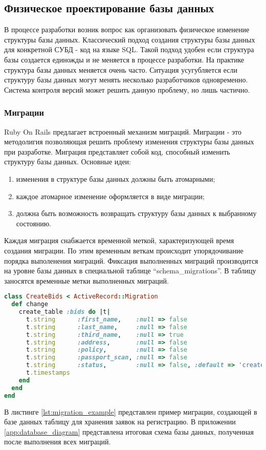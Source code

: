 \subsection{Физическое проектирование базы данных}
В процессе разработки возник вопрос как организовать физическое изменение
структуры базы данных. Классический подход создания структуры базы данных для
конкретной СУБД - код на языке SQL. Такой подход удобен если структура базы
создается единожды и не меняется в процессе разработки. На практике структура
базы данных меняется очень часто. Ситуация усугубляется если структуру базы
данных могут менять несколько разработчиков одновременно. Система контроля
версий может решить данную проблему, но лишь частично.

\subsubsection{Миграции}
Ruby On Rails предлагает встроенный механизм миграций. Миграции - это
методолигия позволяющая решить проблему изменения структуры базы данных при
разработке. Миграция представляет собой код, способный изменить структуру базы
данных.
Основные идеи:
\begin{enumerate}
  \item изменения в структуре базы данных должны быть атомарными;
  \item каждое атомарное изменение оформляется в виде миграции;
  \item должна быть возможность возвращать структуру базы данных к выбранному
состоянию.
\end{enumerate}

Каждая миграция снабжается временной меткой, характеризующей время создания
миграции. По этим временным веткам происходит упорядочивание порядка выполенения
миграций. Фиксация выполненных миграций производится на уровне базы данных в
специальной таблице “schema\_migrations”. В таблицу заносятся временные метки
выполненных миграций.

\begin{lstlisting}[language=Ruby,caption=Пример миграций
,label={lst:migration_example}] 
class CreateBids < ActiveRecord::Migration
  def change
    create_table :bids do |t|
      t.string      :first_name,    :null => false
      t.string      :last_name,     :null => false
      t.string      :third_name,    :null => true
      t.string      :address,       :null => false
      t.string      :policy,        :null => false
      t.string      :passport_scan, :null => false
      t.string      :status,        :null => false, :default => 'created'
      t.timestamps
    end
  end
end
\end{lstlisting}

В листинге \ref{lst:migration_example} представлен пример миграции, создающей в
базе данных таблицу для хранения заявок на регистрацию.
В приложении \ref{app:database_diagram} представлена итоговая схема базы
данных, полученная после выполнения всех миграций.
